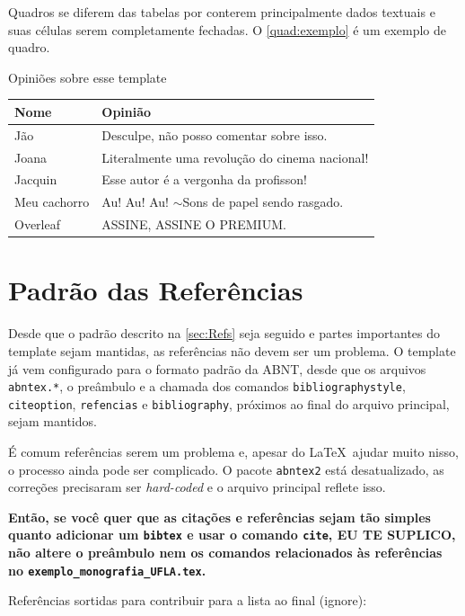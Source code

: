 Quadros se diferem das tabelas por conterem principalmente dados textuais e suas células serem completamente fechadas. O \autoref{quad:exemplo} é um exemplo de quadro.

\begin{quadro}[h]
\centering
\caption{Opiniões sobre esse template}\label{quad:exemplo}
  \begin{tabular}{|l|p{9cm}|}
    \hline 
    \rowcolor[gray]{.9}
    \bf Nome& \bf Opinião\\
    \hline
    Jão& Desculpe, não posso comentar sobre isso.\\
    \hline
    Joana& Literalmente uma revolução do cinema nacional!\\
    \hline
    Jacquin& Esse autor é a vergonha da profisson!\\
    \hline
    Meu cachorro& Au! Au! Au! $\sim$Sons de papel sendo rasgado.\\
    \hline
    Overleaf& ASSINE, ASSINE O PREMIUM.\\
    \hline
    \end{tabular}
    
    \vspace{0.3cm}
\end{quadro}


\section{Padrão das Referências}

Desde que o padrão descrito na \autoref{sec:Refs} seja seguido e partes importantes do template sejam mantidas, as referências não devem ser um problema. O template já vem configurado para o formato padrão da ABNT, desde que os arquivos \texttt{abntex.*}, o preâmbulo e a chamada dos comandos \texttt{bibliographystyle}, \texttt{citeoption}, \texttt{refencias} e \texttt{bibliography}, próximos ao final do arquivo principal, sejam mantidos.

É comum referências serem um problema e, apesar do \LaTeX\ ajudar muito nisso, o processo ainda pode ser complicado. O pacote \texttt{abntex2} está desatualizado, as correções precisaram ser \emph{hard-coded} e o arquivo principal reflete isso.

\textbf{Então, se você quer que as citações e referências sejam tão simples quanto adicionar um \texttt{bibtex} e usar o comando \texttt{cite}, EU TE SUPLICO, não altere o preâmbulo nem os comandos relacionados às referências no \texttt{exemplo\_monografia\_UFLA.tex}.}

Referências sortidas para contribuir para a lista ao final (ignore): \cite{Eco1996,Booth2000,BIB2010,Hexsel2004,Franca2001,Gil2002,Porto2002,Silva2005,UFLA:2015,Moura1998,NBR6023:2002}

